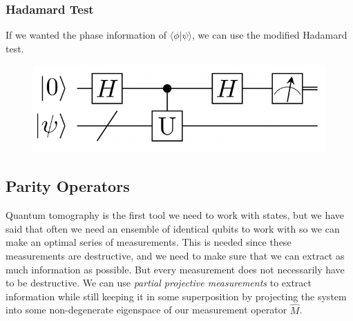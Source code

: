 \documentclass{article}
\newcommand{\braket}[2]{\langle #1 | #2 \rangle}
\begin{document}
    \subsubsection{Hadamard Test}

      If we wanted the phase information of $\braket{\phi}{\psi}$, we can use the modified Hadamard test. 

      \begin{figure}[H]
        \centering 
        \includegraphics[scale=0.4]{img/hadamard_test.png}
        \caption{} 
        \label{fig:hadamard test}
      \end{figure}

  \subsection{Parity Operators}

    Quantum tomography is the first tool we need to work with states, but we have said that often we need an ensemble of identical qubits to work with so we can make an optimal series of measurements. This is needed since these measurements are destructive, and we need to make sure that we can extract as much information as possible. But every measurement does not necessarily have to be destructive. We can use \textit{partial projective measurements} to extract information while still keeping it in some superposition by projecting the system into some non-degenerate eigenspace of our measurement operator $\hat{M}$. 
\end{document}
